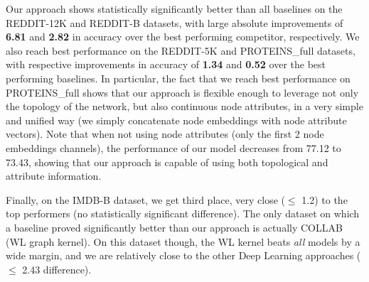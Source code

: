 \documentclass[runningheads]{llncs}
\begin{document}
\vspace{-2cm}

\begin{table*}[!h]
\begin{center}
\end{center}
\captionsetup{justification=centering, size=small}
\caption{10-fold CV average test set classification accuracy of our proposed method compared to state-of-the-art graph kernels and graph CNNs on the bioinformatics dataset (PROTEINS\_full).}
\label{tab:results_bio}
\end{table*}

\vspace{-1cm}

Our approach shows statistically significantly better than all baselines on the REDDIT-12K and REDDIT-B datasets, with large absolute improvements of \textbf{6.81} and \textbf{2.82} in accuracy over the best performing competitor, respectively.
We also reach best performance on the REDDIT-5K and PROTEINS\_full datasets, with respective improvements in accuracy of \textbf{1.34} and \textbf{0.52} over the best performing baselines. In particular, the fact that we reach best performance on PROTEINS\_full shows that our approach is flexible enough to leverage not only the topology of the network, but also continuous node attributes, in a very simple and unified way (we simply concatenate node embeddings with node attribute vectors). Note that when not using node attributes (only the first 2 node embeddings channels), the performance of our model decreases from 77.12 to 73.43, showing that our approach is capable of using both topological and attribute information.

Finally, on the IMDB-B dataset, we get third place, very close ($\leq$ 1.2) to the top performers (no statistically significant difference).
The only dataset on which a baseline proved significantly better than our approach is actually COLLAB (WL graph kernel). On this dataset though, the WL kernel beats \textit{all} models by a wide margin, and we are relatively close to the other Deep Learning approaches ($\leq$ 2.43 difference).
\end{document}
